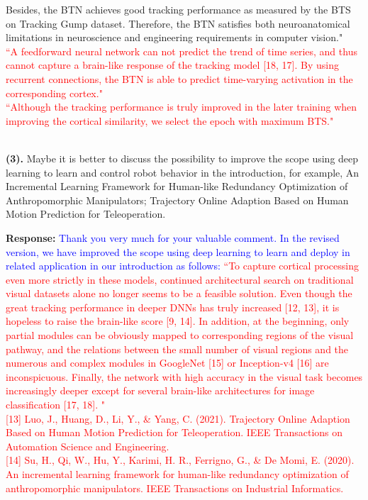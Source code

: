 \documentclass[12pt,journal,onecolumn]{IEEEtran}
\begin{document}
{{Besides, the BTN achieves good tracking performance as measured by the BTS on Tracking Gump dataset. 
Therefore, the BTN satisfies both neuroanatomical limitations in neuroscience and engineering requirements in computer vision."
} \\
\textcolor{red}{
``A feedforward neural network can not predict the trend of time series, and thus cannot capture a brain-like response of the tracking model [18, 17]. 
By using recurrent connections, the BTN is able to predict time-varying activation in the corresponding cortex."
} \\
\textcolor{red}{
``Although the tracking performance is truly improved in the later training when improving the cortical similarity, we select the epoch with maximum BTS."
} \\
}
\\

\vspace{8pt}


\textbf{(3).} Maybe it is better to discuss the possibility to improve the scope using deep learning to learn and control robot behavior in the introduction, for example, 
An Incremental Learning Framework for Human-like Redundancy Optimization of Anthropomorphic Manipulators; 
Trajectory Online Adaption Based on Human Motion Prediction for Teleoperation.

\textbf{Response:} \textcolor{blue}{Thank you very much for your valuable comment. 
In the revised version, we have improved the scope using deep learning to learn and deploy in related application in our introduction as follows:
} 
\textcolor{red}{
``To capture cortical processing even more strictly in these models, continued architectural search on traditional visual datasets alone no longer seems to be a feasible solution. 
Even though the great tracking performance in deeper DNNs has truly increased [12, 13], it is hopeless to raise the brain-like score [9, 14]. 
In addition, at the beginning, only partial modules can be obviously mapped to corresponding regions of the visual pathway, and the relations between the small number of visual regions and the numerous and complex modules in GoogleNet [15] or Inception-v4 [16] are inconspicuous. 
Finally, the network with high accuracy in the visual task becomes increasingly deeper except for several brain-like architectures for image classification [17, 18]. "
} \\
\textcolor{red}{[13] Luo, J., Huang, D., Li, Y., \& Yang, C. (2021). Trajectory Online Adaption Based on Human Motion Prediction for Teleoperation. IEEE Transactions on Automation Science and Engineering.
} \\
\textcolor{red}{[14] Su, H., Qi, W., Hu, Y., Karimi, H. R., Ferrigno, G., \& De Momi, E. (2020). An incremental learning framework for human-like redundancy optimization of anthropomorphic manipulators. IEEE Transactions on Industrial Informatics.
} \\
\\
\vspace{8pt}
\end{document}
